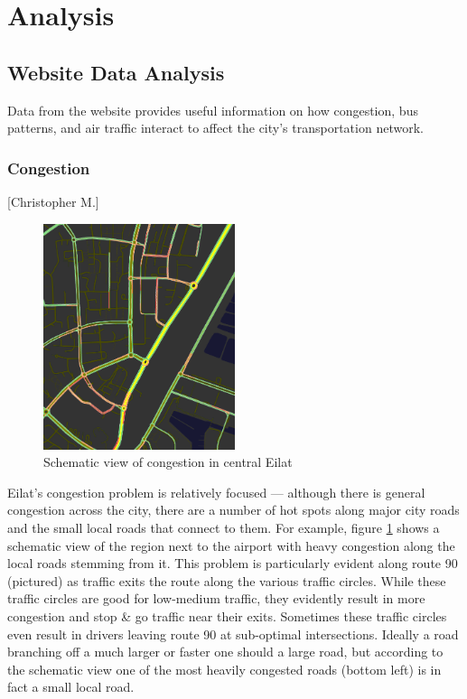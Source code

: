 \documentclass[12pt]{article}                               %
\begin{document}
\newpage
\section{Analysis}\label{sec:analysis}
\subsection{Website Data Analysis}
Data from the website provides useful information on how congestion, bus patterns, and air traffic interact to affect the city's transportation network.

\subsubsection{Congestion}[Christopher M.]
\begin{figure}[H]
    \centering
    \includegraphics[width=0.5\textwidth]{images/congestion.png}
    \caption{Schematic view of congestion in central Eilat}
    \label{img:eilat_congestion}
\end{figure}

Eilat's congestion problem is relatively focused --- although there is general congestion across the city, there are a number of hot spots along major city roads and the small local roads that connect to them. For example, figure \ref{img:eilat_congestion} shows a schematic view of the region next to the airport with heavy congestion along the local roads stemming from it. This problem is particularly evident along route 90 (pictured) as traffic exits the route along the various traffic circles. While these traffic circles are good for low-medium traffic, they evidently result in more congestion and stop \& go traffic near their exits. Sometimes these traffic circles even result in drivers leaving route 90 at sub-optimal intersections. Ideally a road branching off a much larger or faster one should a large road, but according to the schematic view one of the most heavily congested roads (bottom left) is in fact a small local road.
\end{document}
